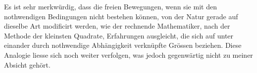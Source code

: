 \documentclass[14pt]{memoir}
\theoremstyle{plain}
\theoremstyle{remark}
\begin{document}
Es ist sehr merkwürdig, dass die freien Bewegungen, wenn sie mit den nothwendigen Bedingungen nicht bestehen können, von der Natur gerade auf dieselbe Art modificirt werden, wie der rechnende Mathematiker, nach der Methode der kleinsten Quadrate, Erfahrungen ausgleicht, die sich auf unter einander durch nothwendige Abhängigkeit verknüpfte Grössen beziehen. Diese Analogie liesse sich noch weiter verfolgen, was jedoch gegenwärtig nicht zu meiner Absicht gehört. 
\end{document}

